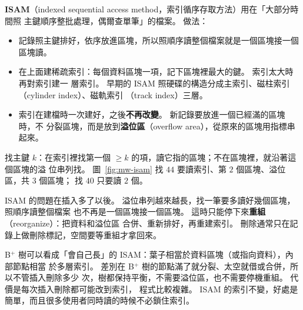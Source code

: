 \textbf{ISAM}（indexed sequential access method，索引循序存取方法）用在「大部分時間照
主鍵順序整批處理，偶爾查單筆」的檔案。 做法：
\begin{itemize}
\item 記錄照主鍵排好，依序放進區塊，所以照順序讀整個檔案就是一個區塊接一個區塊讀。
\item 在上面建稀疏索引：每個資料區塊一項，記下區塊裡最大的鍵。 索引太大時再對索引建一
層索引。 早期的 ISAM 照硬碟的構造分成主索引、磁柱索引（cylinder index）、磁軌索引
（track index）三層。
\item 索引在建檔時一次建好，之後\textbf{不再改變}。 新記錄要放進一個已經滿的區塊時，不
分裂區塊，而是放到\textbf{溢位區}（overflow area），從原來的區塊用指標串起來。
\end{itemize}

\begin{center}
\label{fig:mw-isam}
\end{center}

找主鍵 $k$：在索引裡找第一個 $\ge k$ 的項，讀它指的區塊；不在區塊裡，就沿著這個區塊的溢
位串列找。 圖~\ref{fig:mw-isam} 找 $44$ 要讀索引、第 $2$ 個區塊、溢位區，共 $3$ 個區塊；
找 $40$ 只要讀 $2$ 個。

ISAM 的問題在插入多了以後。 溢位串列越來越長，找一筆要多讀好幾個區塊，照順序讀整個檔案
也不再是一個區塊接一個區塊。 這時只能停下來\textbf{重組}（reorganize）：把資料和溢位區
合併、重新排好，再重建索引。 刪除通常只在記錄上做刪除標記，空間要等重組才拿回來。

B$^{+}$ 樹可以看成「會自己長」的 ISAM：葉子相當於資料區塊（或指向資料），內部節點相當
於多層索引。 差別在 B$^{+}$ 樹的節點滿了就分裂、太空就借或合併，所以不管插入刪除多少
次，樹都保持平衡，不需要溢位區，也不需要停機重組。 代價是每次插入刪除都可能改到索引，
程式比較複雜。 ISAM 的索引不變，好處是簡單，而且很多使用者同時讀的時候不必鎖住索引。

